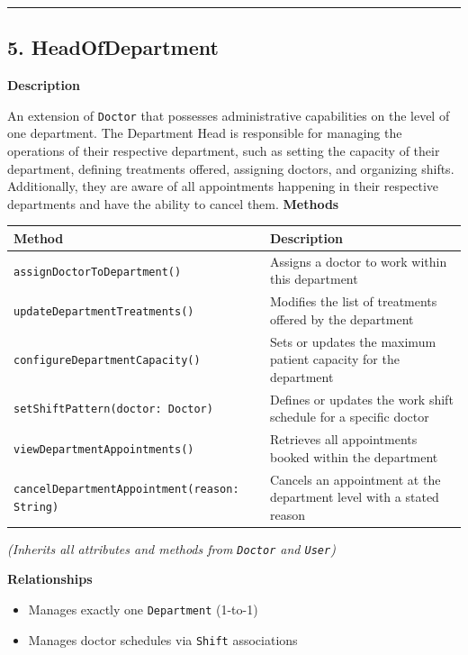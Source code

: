 \documentclass[12pt, a4paper]{article}
\begin{document}
\par\medskip\hrule\medskip

\subsection{5. HeadOfDepartment}\label{sec:5-headofdepartment}

\textbf{Description}

An extension of \texttt{Doctor} that possesses administrative capabilities on the level of one department. The Department Head is responsible for managing the operations of their respective department, such as setting the capacity of their department, defining treatments offered, assigning doctors, and organizing shifts. Additionally, they are aware of all appointments happening in their respective departments and have the ability to cancel them.
\textbf{Methods}

\begin{center}
\small
\renewcommand{\arraystretch}{1.35}
\begin{tabularx}{\textwidth}{|M|Y|}
\hline
{}
\textbf{Method} & \textbf{Description} \\ \hline
\texttt{assignDoctorToDepartment()} & Assigns a doctor to work within this department \\ \hline
\texttt{updateDepartmentTreatments()} & Modifies the list of treatments offered by the department \\ \hline
\texttt{configureDepartmentCapacity()} & Sets or updates the maximum patient capacity for the department \\ \hline
\texttt{setShiftPattern(doctor: Doctor)} & Defines or updates the work shift schedule for a specific doctor \\ \hline
\texttt{viewDepartmentAppointments()} & Retrieves all appointments booked within the department \\ \hline
\texttt{cancelDepartmentAppointment(reason: String)} & Cancels an appointment at the department level with a stated reason \\ \hline
\end{tabularx}
\end{center}

\emph{(Inherits all attributes and methods from \texttt{Doctor} and \texttt{User})}

\textbf{Relationships}

\begin{itemize}
    \item Manages exactly one \texttt{Department} (1-to-1)
    \item Manages doctor schedules via \texttt{Shift} associations
\end{itemize}
\end{document}
